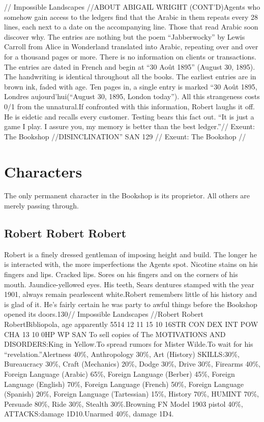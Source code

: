 \documentclass{report}
\begin{document}
\begin{multicols}{2}
// Impossible Landscapes //ABOUT ABIGAIL WRIGHT (CONT'D)Agents who somehow gain access to the ledgers find that the Arabic in them repeats every 28 lines, each next to a date on the accompanying line. Those that read Arabic soon discover why. The entries are nothing but the poem “Jabberwocky” by Lewis Carroll from Alice in Wonderland translated into Arabic, repeating over and over for a thousand pages or more. There is no information on clients or transactions. The entries are dated in French and begin at “30 Août 1895” (August 30, 1895). The handwriting is identical throughout all the books. The earliest entries are in brown ink, faded with age. Ten pages in, a single entry is marked “30 Août 1895, Londres aujourd'hui(“August 30, 1895, London today”). All this strangeness costs 0/1 from the unnatural.If confronted with this information, Robert laughs it off. He is eidetic and recalls every customer. Testing bears this fact out. “It is just a game I play. I assure you, my memory is better than the best ledger.”// Exeunt: The Bookshop //DISINCLINATION” SAN 129\newpage
// Exeunt: The Bookshop //
\section{Characters}
The only permanent character in the Bookshop is its proprietor. All others are merely passing through.
\subsection{Robert Robert Robert}
Robert is a finely dressed gentleman of imposing height and build. The longer he is interacted with, the more imperfections the Agents spot. Nicotine stains on his fingers and lips. Cracked lips. Sores on his fingers and on the corners of his mouth. Jaundice-yellowed eyes. His teeth, Sears dentures stamped with the year 1901, always remain pearlescent white.Robert remembers little of his history and is glad of it. He's fairly certain he was party to awful things before the Bookshop opened its doors.130// Impossible Landscapes //Robert Robert RobertBibliopola, age apparently 5514 12 11 15 10 16STR CON DEX INT POW CHA 13 10 0HP WP SAN  To sell copies of The MOTIVATIONS AND DISORDERS:King in Yellow.To spread rumors for Mister Wilde.To wait for his “revelation.”Alertness 40\%, Anthropology 30\%, Art (History) SKILLS:30\%, Bureaucracy 30\%, Craft (Mechanics) 20\%, Dodge 30\%, Drive 30\%, Firearms 40\%, Foreign Language (Arabic) 65\%, Foreign Language (Berber) 45\%, Foreign Language (English) 70\%, Foreign Language (French) 50\%, Foreign Language (Spanish) 20\%, Foreign Language (Tartessian) 15\%, History 70\%, HUMINT 70\%, Persuade 80\%, Ride 30\%, Stealth 30\%.Browning FN Model 1903 pistol 40\%, ATTACKS:damage 1D10.Unarmed 40\%, damage 1D4.\newpage
\end{multicols}
\end{document}
